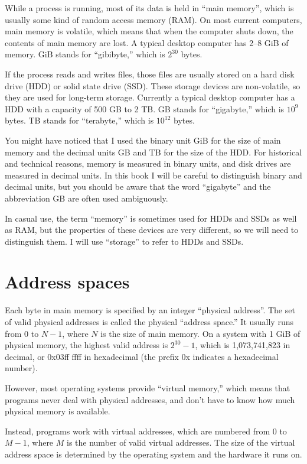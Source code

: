 \documentclass[12pt]{book}
\begin{document}
While a process is running, most of its data is held in ``main
memory'', which is usually some kind of random access memory (RAM).
On most current computers, main memory is volatile, which means that
when the computer shuts down, the contents of main memory are lost.
A typical desktop computer has 2--8 GiB of
memory.  GiB stands for ``gibibyte,'' which is $2^{30}$ bytes.  

If the process reads and writes files, those files are usually stored
on a hard disk drive (HDD) or solid state drive (SSD).  These storage
devices are non-volatile, so they are used for long-term storage.
Currently a typical desktop computer has a HDD with a capacity of 500
GB to 2 TB.  GB stands for ``gigabyte,'' which is $10^9$ bytes.  TB
stands for ``terabyte,'' which is $10^{12}$ bytes.

You might have noticed that I used the binary unit
GiB for the size of main memory and the decimal units GB and TB for
the size of the HDD.  For historical and technical reasons, memory is
measured in binary units, and disk drives are measured in decimal
units.  In this book I will be careful to distinguish binary and
decimal units, but you should be aware that the word ``gigabyte'' and the
abbreviation GB are often used ambiguously.

In casual use, the term ``memory'' is sometimes used for HDDs and SSDs
as well as RAM, but the properties of these devices are very
different, so we will need to distinguish them.  I will use
``storage'' to refer to HDDs and SSDs.


\section{Address spaces}

Each byte in main memory is specified by an integer ``physical
address''.  The set of valid physical addresses is called the
physical ``address space.''  It
usually runs from 0 to $N-1$, where $N$ is
the size of main memory.  On a system with 1 GiB of physical memory,
the highest valid address is $2^{30}-1$, which is 1,073,741,823 in
decimal, or 0x03ff ffff in hexadecimal (the prefix 0x indicates a
hexadecimal number).

However, most operating systems provide ``virtual memory,'' which
means that programs never deal with physical addresses, and don't 
have to know how much physical memory is available.

Instead, programs work with virtual addresses, which are numbered
from 0 to $M-1$, where $M$ is the number of valid virtual addresses.
The size of the virtual address space is determined by the operating
system and the hardware it runs on.
\end{document}

